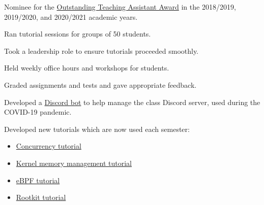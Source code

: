 \begin{cventries}
{\begin{cvitems}
        \item Nominee for the \href{https://carleton.ca/tasupport/taawards/edc-outstanding-ta-awards/}
            {Outstanding Teaching Assistant Award} in the 2018/2019, 2019/2020, and 2020/2021 academic years.
        \item Ran tutorial sessions for groups of 50 students.
        \item Took a leadership role to ensure tutorials proceeded smoothly.
        \item Held weekly office hours and workshops for students.
        \item Graded assignments and tests and gave appropriate feedback.
        \item Developed a \href{https://github.com/willfindlay/tabot}{Discord bot} to help manage the class Discord server, used during the COVID-19 pandemic.
        \item Developed new tutorials which are now used each semester:
          \begin{itemize}
            \item \href{https://homeostasis.scs.carleton.ca/wiki/index.php/Operating_Systems_2020W:_Tutorial_6}
              {Concurrency tutorial}
            \item \href{https://homeostasis.scs.carleton.ca/wiki/index.php/Operating_Systems_2020W:_Tutorial_8}
              {Kernel memory management tutorial}
            \item \href{https://homeostasis.scs.carleton.ca/wiki/index.php/Operating_Systems_2020W:_Tutorial_9}
              {eBPF tutorial}
            \item \href{https://homeostasis.scs.carleton.ca/wiki/index.php/Operating_Systems_2019F:_Tutorial_9}
              {Rootkit tutorial}
          \end{itemize}
      \end{cvitems}
    }

\end{cventries}
